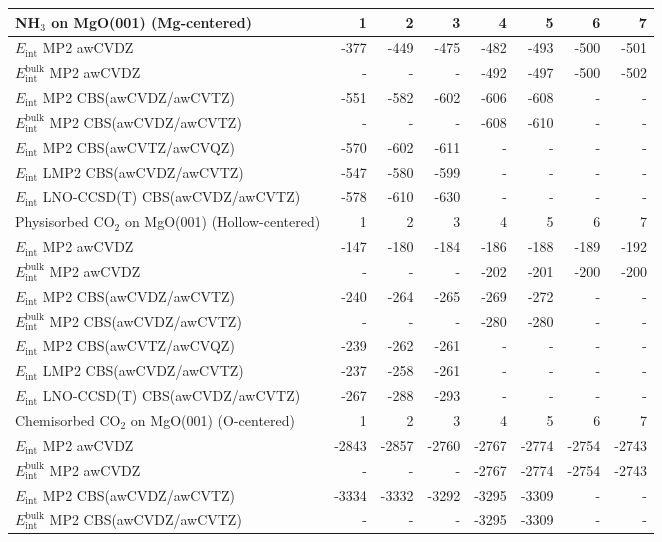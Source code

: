 \begin{longtable}{lrrrrrrr}
\toprule
NH$_3$ on MgO(001) (Mg-centered) & 1 & 2 & 3 & 4 & 5 & 6 & 7 \\ 
\midrule
$E_\text{int}$ MP2 awCVDZ & -377 & -449 & -475 & -482 & -493 & -500 & -501 \\
$E_\text{int}^\text{bulk}$ MP2 awCVDZ & - & - & - & -492 & -497 & -500 & -502 \\
$E_\text{int}$ MP2 CBS(awCVDZ/awCVTZ) & -551 & -582 & -602 & -606 & -608 & - & - \\
$E_\text{int}^\text{bulk}$ MP2 CBS(awCVDZ/awCVTZ) & - & - & - & -608 & -610 & - & - \\
$E_\text{int}$ MP2 CBS(awCVTZ/awCVQZ) & -570 & -602 & -611 & - & - & - & - \\
$E_\text{int}$ LMP2 CBS(awCVDZ/awCVTZ) & -547 & -580 & -599 & - & - & - & - \\
$E_\text{int}$ LNO-CCSD(T) CBS(awCVDZ/awCVTZ) & -578 & -610 & -630 & - & - & - & - \\
\toprule
Physisorbed CO$_2$ on MgO(001) (Hollow-centered) & 1 & 2 & 3 & 4 & 5 & 6 & 7 \\ 
\midrule
$E_\text{int}$ MP2 awCVDZ & -147 & -180 & -184 & -186 & -188 & -189 & -192 \\
$E_\text{int}^\text{bulk}$ MP2 awCVDZ & - & - & - & -202 & -201 & -200 & -200 \\
$E_\text{int}$ MP2 CBS(awCVDZ/awCVTZ) & -240 & -264 & -265 & -269 & -272 & - & - \\
$E_\text{int}^\text{bulk}$ MP2 CBS(awCVDZ/awCVTZ) & - & - & - & -280 & -280 & - & - \\
$E_\text{int}$ MP2 CBS(awCVTZ/awCVQZ) & -239 & -262 & -261 & - & - & - & - \\
$E_\text{int}$ LMP2 CBS(awCVDZ/awCVTZ) & -237 & -258 & -261 & - & - & - & - \\
$E_\text{int}$ LNO-CCSD(T) CBS(awCVDZ/awCVTZ) & -267 & -288 & -293 & - & - & - & - \\
\toprule
Chemisorbed CO$_2$ on MgO(001) (O-centered) & 1 & 2 & 3 & 4 & 5 & 6 & 7 \\ 
\midrule
$E_\text{int}$ MP2 awCVDZ & -2843 & -2857 & -2760 & -2767 & -2774 & -2754 & -2743 \\
$E_\text{int}^\text{bulk}$ MP2 awCVDZ & - & - & - & -2767 & -2774 & -2754 & -2743 \\
$E_\text{int}$ MP2 CBS(awCVDZ/awCVTZ) & -3334 & -3332 & -3292 & -3295 & -3309 & - & - \\
$E_\text{int}^\text{bulk}$ MP2 CBS(awCVDZ/awCVTZ) & - & - & - & -3295 & -3309 & - & - \\

\end{longtable}
